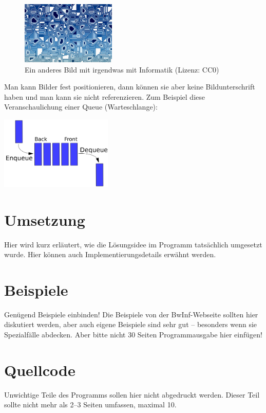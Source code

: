 \documentclass[a4paper,10pt,ngerman]{scrartcl}
\begin{document}
\begin{figure}
	\begin{center}
		\includegraphics[width=0.4\textwidth]{computerbild2.jpg}
		\caption{Ein anderes Bild mit irgendwas mit Informatik (Lizenz: CC0)}
		\label{abb:bild2}
	\end{center}
\end{figure}

Man kann Bilder fest positionieren, dann können sie aber keine Bildunterschrift haben und man kann sie nicht referenzieren. Zum Beispiel diese Veranschaulichung einer Queue (Warteschlange):
\begin{center}
	\includegraphics[width=0.4\textwidth]{queue.png}
\end{center}

\section{Umsetzung}
Hier wird kurz erläutert, wie die Lösungsidee im Programm tatsächlich umgesetzt wurde. Hier können auch Implementierungsdetails erwähnt werden.

\section{Beispiele}
Genügend Beispiele einbinden! Die Beispiele von der BwInf-Webseite sollten hier diskutiert werden, aber auch eigene Beispiele sind sehr gut – besonders wenn sie Spezialfälle abdecken. Aber bitte nicht 30 Seiten Programmausgabe hier einfügen!

\section{Quellcode}
Unwichtige Teile des Programms sollen hier nicht abgedruckt werden. Dieser Teil sollte nicht mehr als 2–3 Seiten umfassen, maximal 10.
\end{document}
